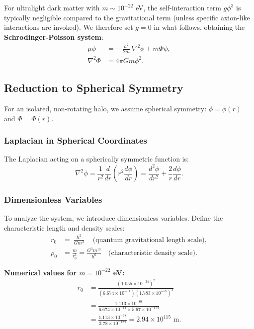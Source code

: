 \documentclass[11pt,a4paper]{article}
\newcommand{\ee}[1]{\times 10^{#1}}
\newcommand{\hbar}{\ensuremath{\hslash}}
\theoremstyle{definition}
\theoremstyle{remark}
\begin{document}
For ultralight dark matter with $m \sim 10^{-22}$ eV, the self-interaction term $g\phi^3$ is typically negligible compared to the gravitational term (unless specific axion-like interactions are invoked). We therefore set $g = 0$ in what follows, obtaining the \textbf{Schrodinger-Poisson system}:
\begin{align}
\mu\phi &= -\frac{\hbar^2}{2m}\nabla^2\phi + m\Phi\phi, \label{eq:SP_1}\\
\nabla^2\Phi &= 4\pi G m\phi^2. \label{eq:SP_2}
\end{align}

\subsection{Reduction to Spherical Symmetry}
\label{sec:spherical_reduction}

For an isolated, non-rotating halo, we assume spherical symmetry: $\phi = \phi(r)$ and $\Phi = \Phi(r)$.

\subsubsection{Laplacian in Spherical Coordinates}

The Laplacian acting on a spherically symmetric function is:
\begin{equation}
\nabla^2\phi = \frac{1}{r^2}\frac{d}{dr}\left(r^2\frac{d\phi}{dr}\right) = \frac{d^2\phi}{dr^2} + \frac{2}{r}\frac{d\phi}{dr}.
\end{equation}

\subsubsection{Dimensionless Variables}

To analyze the system, we introduce dimensionless variables. Define the characteristic length and density scales:
\begin{align}
r_0 &= \frac{\hbar^2}{Gm^3} \quad \text{(quantum gravitational length scale)}, \\
\rho_0 &= \frac{m}{r_0^3} = \frac{G^3 m^{10}}{\hbar^6} \quad \text{(characteristic density scale)}.
\end{align}

\textbf{Numerical values for $m = 10^{-22}$ eV:}
\begin{align}
r_0 &= \frac{(1.055 \ee{-34})^2}{(6.674 \ee{-11})(1.783 \ee{-58})^3} \nonumber \\
&= \frac{1.113 \ee{-68}}{6.674 \ee{-11} \times 5.67 \ee{-174}} \nonumber \\
&= \frac{1.113 \ee{-68}}{3.78 \ee{-184}} = 2.94 \ee{115} \text{ m}.
\end{align}
\end{document}
